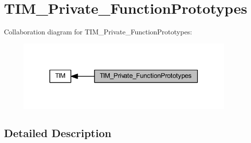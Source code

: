 \hypertarget{group___t_i_m___private___function_prototypes}{}\section{T\+I\+M\+\_\+\+Private\+\_\+\+Function\+Prototypes}
\label{group___t_i_m___private___function_prototypes}
Collaboration diagram for T\+I\+M\+\_\+\+Private\+\_\+\+Function\+Prototypes\+:
\nopagebreak
\begin{figure}[H]
\begin{center}
\leavevmode
\includegraphics[width=305pt]{group___t_i_m___private___function_prototypes}
\end{center}
\end{figure}


\subsection{Detailed Description}
